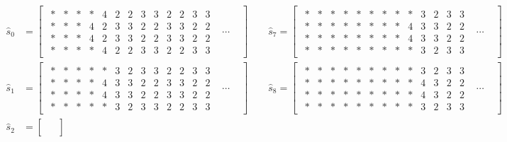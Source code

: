 \documentclass[12pt]{amsart}
\begin{document}
\begin{align*}
\hat{s}_0 &= 
\begin{bmatrix}
\begin{smallmatrix}
* & * & * & * & 4 & 2 & 2 & 3 & 3 & 2 & 2 & 3  & 3 \\
* & * & * & 4 & 2 & 3 & 3 & 2 & 2 & 3 & 3 & 2 & 2 \\
* & * & * & 4 & 2 & 3 & 3 & 2 & 2 & 3 & 3 & 2 & 2 \\ 
* & * & * & * & 4 & 2 & 2 & 3 & 3 & 2 & 2 & 3 & 3
\end{smallmatrix}
& 
\cdots
&
\end{bmatrix}
\qquad
\hat{s}_7 = 
\begin{bmatrix}
\begin{smallmatrix}
* & * & * & * & * & * & * & * & * & 3 & 2 & 3 & 3 \\
* & * & * & * & * & * & * & * & 4 & 3 & 3 & 2 & 2  \\
* & * & * & * & * & * & * & * & 4 & 3 & 3 & 2 & 2 \\
* & * & * & * & * & * & * & * & * & 3 & 2 & 3 & 3
\end{smallmatrix}
& 
\cdots
&
\end{bmatrix} \\
\hat{s}_1 &= 
\begin{bmatrix}
\begin{smallmatrix}
* & * & * & * & * & 3 & 2 & 3 & 3 & 2 & 2 & 3 & 3 \\ 
* & * & * & * & 4 & 3 & 3 & 2 & 2 & 3 & 3 & 2 & 2 \\
* & * & * & * & 4 & 3 & 3 & 2 & 2 & 3 & 3 & 2 & 2 \\
* & * & * & * & * & 3 & 2 & 3 & 3 & 2 & 2 & 3 & 3
\end{smallmatrix}
& 
\cdots
&
\end{bmatrix} 
\qquad \hat{s}_8 =
\begin{bmatrix}
\begin{smallmatrix}
* & * & * & * & * & * & * & * & * & 3 & 2 & 3 & 3 \\ 
* & * & * & * & * & * & * & * & * & 4 & 3 & 2 & 2 \\ 
* & * & * & * & * & * & * & * & * & 4 & 3 & 2 & 2 \\ 
* & * & * & * & * & * & * & * & * & 3 & 2 & 3 & 3
\end{smallmatrix}
& 
\cdots
&
\end{bmatrix} \\
\hat{s}_2 &= 
\begin{bmatrix}
\begin{smallmatrix}

\end{smallmatrix}
\end{bmatrix}
\end{align*}
\end{document}
